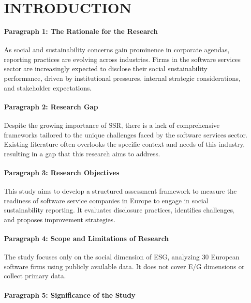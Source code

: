 \chapter{INTRODUCTION}

\subsubsection{Paragraph 1: The Rationale for the Research}

As social and sustainability concerns gain prominence in corporate agendas, 
reporting practices are evolving across industries. Firms in the software services sector are increasingly expected to 
disclose their social sustainability performance, 
driven by institutional pressures, internal strategic considerations, 
and stakeholder expectations.

\subsubsection{Paragraph 2: Research Gap}

Despite the growing importance of SSR, there is a lack of comprehensive frameworks 
tailored to the unique challenges faced by the software services sector. 
Existing literature often overlooks the specific context and needs of this 
industry, resulting in a gap that this research aims to address.

\subsubsection{Paragraph 3: Research Objectives}

This study aims to develop a structured assessment framework to measure 
the readiness of software service companies in Europe to engage 
in social sustainability reporting. It evaluates disclosure practices, 
identifies challenges, and proposes improvement strategies.

\subsubsection{Paragraph 4: Scope and Limitations of Research}
The study focuses only on the social dimension of ESG, analyzing 30 European 
software firms using publicly available data. 
It does not cover E/G dimensions or collect primary data.

\subsubsection{Paragraph 5: Significance of the Study}

